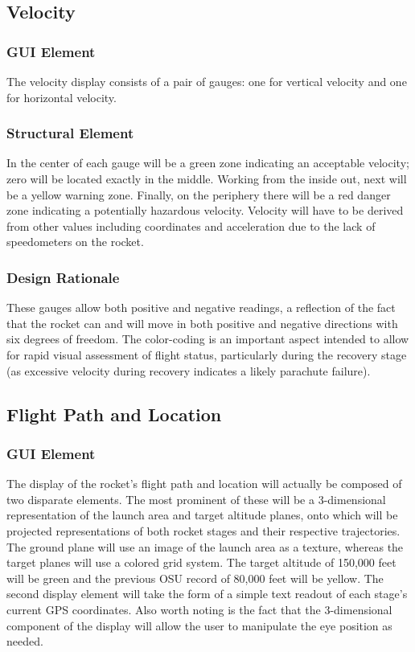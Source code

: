 \documentclass[journal,10pt,onecolumn,compsoc]{IEEEtran}
\begin{document}
	\subsection{Velocity}

		\subsubsection{GUI Element}
			The velocity display consists of a pair of gauges: one for vertical velocity and one for horizontal velocity.
			
		\subsubsection{Structural Element}
			In the center of each gauge will be a green zone indicating an acceptable velocity; zero will be located exactly in the middle.
			Working from the inside out, next will be a yellow warning zone.
			Finally, on the periphery there will be a red danger zone indicating a potentially hazardous velocity.
			Velocity will have to be derived from other values including coordinates and acceleration due to the lack of speedometers on the rocket.
			
		\subsubsection{Design Rationale}
			These gauges allow both positive and negative readings, a reflection of the fact that the rocket can and will move in both positive and negative directions with six degrees of freedom.
			The color-coding is an important aspect intended to allow for rapid visual assessment of flight status, particularly during the recovery stage (as excessive velocity during recovery indicates a likely parachute failure).

	\subsection{Flight Path and Location}

		\subsubsection{GUI Element}
			The display of the rocket's flight path and location will actually be composed of two disparate elements.
			The most prominent of these will be a 3-dimensional representation of the launch area and target altitude planes, onto which will be projected representations of both rocket stages and their respective trajectories.
			The ground plane will use an image of the launch area as a texture, whereas the target planes will use a colored grid system.
			The target altitude of 150,000 feet will be green and the previous OSU record of 80,000 feet will be yellow.
			The second display element will take the form of a simple text readout of each stage's current GPS coordinates.
			Also worth noting is the fact that the 3-dimensional component of the display will allow the user to manipulate the eye position as needed.
			
\end{document}
